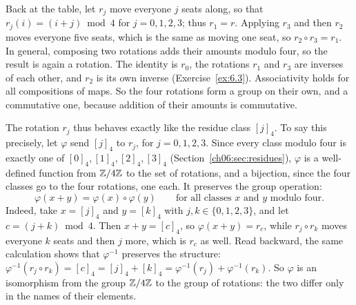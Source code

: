 Back at the table, let $r_j$ move everyone $j$ seats along, so that $r_j(i)=(i+j)\bmod4$ for $j=0,1,2,3$; thus $r_1=r$. Applying $r_3$ and then $r_2$ moves everyone five seats, which is the same as moving one seat, so $r_2\circ r_3=r_1$. In general, composing two rotations adds their amounts modulo four, so the result is again a rotation. The identity is $r_0$, the rotations $r_1$ and $r_3$ are inverses of each other, and $r_2$ is its own inverse (Exercise~\ref{ex:6.3}). Associativity holds for all compositions of maps. So the four rotations form a group on their own, and a commutative one, because addition of their amounts is commutative.

The rotation $r_j$ thus behaves exactly like the residue class $[j]_4$. To say this precisely, let $\varphi$ send $[j]_4$ to $r_j$, for $j=0,1,2,3$. Since every class modulo four is exactly one of $[0]_4,[1]_4,[2]_4,[3]_4$ (Section~\ref{ch06:sec:residues}), $\varphi$ is a well-defined function from $\mathbb Z/4\mathbb Z$ to the set of rotations, and a bijection, since the four classes go to the four rotations, one each. It preserves the group operation:
\[
\varphi(x+y)=\varphi(x)\circ\varphi(y)\qquad\text{for all classes $x$ and $y$ modulo four.}
\]
Indeed, take $x=[j]_4$ and $y=[k]_4$ with $j,k\in\{0,1,2,3\}$, and let $c=(j+k)\bmod4$. Then $x+y=[c]_4$, so $\varphi(x+y)=r_c$, while $r_j\circ r_k$ moves everyone $k$ seats and then $j$ more, which is $r_c$ as well. Read backward, the same calculation shows that $\varphi^{-1}$ preserves the structure: $\varphi^{-1}(r_j\circ r_k)=[c]_4=[j]_4+[k]_4=\varphi^{-1}(r_j)+\varphi^{-1}(r_k)$. So $\varphi$ is an isomorphism from the group $\mathbb Z/4\mathbb Z$ to the group of rotations: the two differ only in the names of their elements.
